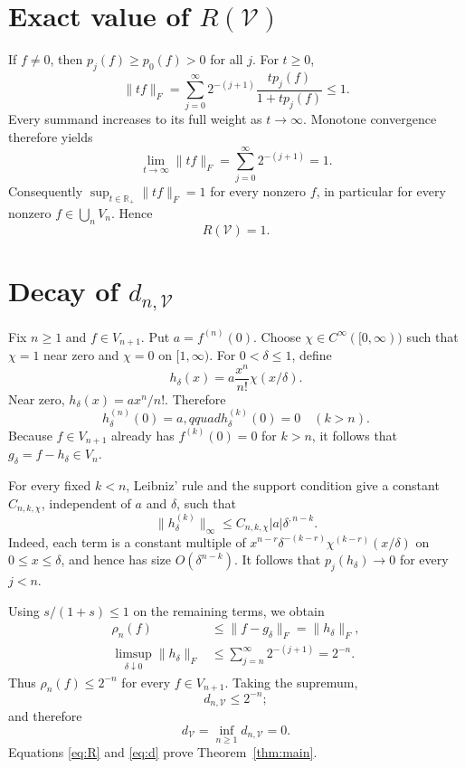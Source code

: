\documentclass[11pt]{article}
\newcommand{\R}{\mathbb R}
\newcommand{\V}{\mathcal V}
\begin{document}
\section{Exact value of \texorpdfstring{$R(\mathcal V)$}{R(V)}}

If $f\neq0$, then $p_j(f)\geq p_0(f)>0$ for all $j$. For $t\geq0$,
\[
 \|tf\|_F=\sum_{j=0}^{\infty}2^{-(j+1)}
 \frac{t p_j(f)}{1+t p_j(f)}\leq1.
\]
Every summand increases to its full weight as $t\to\infty$. Monotone
convergence therefore yields
\[
 \lim_{t\to\infty}\|tf\|_F
 =\sum_{j=0}^{\infty}2^{-(j+1)}=1.
\]
Consequently $\sup_{t\in\R_+}\|tf\|_F=1$ for every nonzero $f$, in
particular for every nonzero $f\in\bigcup_nV_n$. Hence
\[
 R(\V)=1. \tag{3}\label{eq:R}
\]

\section{Decay of \texorpdfstring{$d_{n,\mathcal V}$}{d(n,V)}}

Fix $n\geq1$ and $f\in V_{n+1}$. Put $a=f^{(n)}(0)$. Choose
$\chi\in C^\infty([0,\infty))$ such that $\chi=1$ near zero and
$\chi=0$ on $[1,\infty)$. For $0<\delta\leq1$, define
\[
 h_\delta(x)=a\frac{x^n}{n!}\chi(x/\delta).
 \tag{4}\label{eq:cutoff}
\]
Near zero, $h_\delta(x)=a x^n/n!$. Therefore
\[
 h_\delta^{(n)}(0)=a,qquad
 h_\delta^{(k)}(0)=0\quad(k>n).
\]
Because $f\in V_{n+1}$ already has $f^{(k)}(0)=0$ for $k>n$, it follows that
$g_\delta=f-h_\delta\in V_n$.

For every fixed $k<n$, Leibniz' rule and the support condition give a constant
$C_{n,k,\chi}$, independent of $a$ and $\delta$, such that
\[
 \|h_\delta^{(k)}\|_\infty
 \leq C_{n,k,\chi}|a|\delta^{,n-k}.
 \tag{5}\label{eq:lowder}
\]
Indeed, each term is a constant multiple of
$x^{n-r}\delta^{-(k-r)}\chi^{(k-r)}(x/\delta)$ on $0\leq x\leq\delta$,
and hence has size $O(\delta^{n-k})$. It follows that
$p_j(h_\delta)\to0$ for every $j<n$.

Using $s/(1+s)\leq1$ on the remaining terms, we obtain
\begin{align*}
 \rho_n(f)
 &\leq \|f-g_\delta\|_F=\|h_\delta\|_F,\\
 \limsup_{\delta\downarrow0}\|h_\delta\|_F
 &\leq \sum_{j=n}^{\infty}2^{-(j+1)}=2^{-n}.
\end{align*}
Thus $\rho_n(f)\leq2^{-n}$ for every $f\in V_{n+1}$. Taking the supremum,
\[
 d_{n,\V}\leq2^{-n};
\]
and therefore
\[
 d_{\V}=\inf_{n\geq1}d_{n,\V}=0. \tag{6}\label{eq:d}
\]
Equations \eqref{eq:R} and \eqref{eq:d} prove Theorem~\ref{thm:main}.
\end{document}

